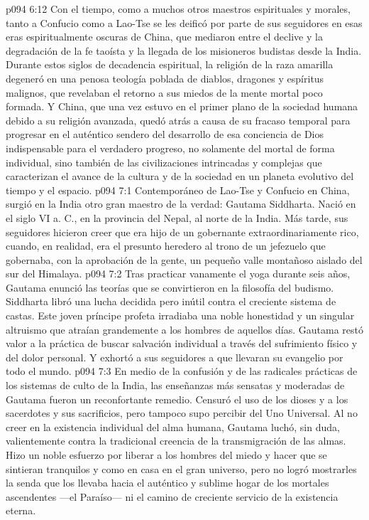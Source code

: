 \vs p094 6:12 Con el tiempo, como a muchos otros maestros espirituales y morales, tanto a Confucio como a Lao\hyp{}Tse se les deificó por parte de sus seguidores en esas eras espiritualmente oscuras de China, que mediaron entre el declive y la degradación de la fe taoísta y la llegada de los misioneros budistas desde la India. Durante estos siglos de decadencia espiritual, la religión de la raza amarilla degeneró en una penosa teología poblada de diablos, dragones y espíritus malignos, que revelaban el retorno a sus miedos de la mente mortal poco formada. Y China, que una vez estuvo en el primer plano de la sociedad humana debido a su religión avanzada, quedó atrás a causa de su fracaso temporal para progresar en el auténtico sendero del desarrollo de esa conciencia de Dios indispensable para el verdadero progreso, no solamente del mortal de forma individual, sino también de las civilizaciones intrincadas y complejas que caracterizan el avance de la cultura y de la sociedad en un planeta evolutivo del tiempo y el espacio.
\vs p094 7:1 Contemporáneo de Lao\hyp{}Tse y Confucio en China, surgió en la India otro gran maestro de la verdad: Gautama Siddharta. Nació en el siglo VI a. C., en la provincia del Nepal, al norte de la India. Más tarde, sus seguidores hicieron creer que era hijo de un gobernante extraordinariamente rico, cuando, en realidad, era el presunto heredero al trono de un jefezuelo que gobernaba, con la aprobación de la gente, un pequeño valle montañoso aislado del sur del Himalaya.
\vs p094 7:2 Tras practicar vanamente el yoga durante seis años, Gautama enunció las teorías que se convirtieron en la filosofía del budismo. Siddharta libró una lucha decidida pero inútil contra el creciente sistema de castas. Este joven príncipe profeta irradiaba una noble honestidad y un singular altruismo que atraían grandemente a los hombres de aquellos días. Gautama restó valor a la práctica de buscar salvación individual a través del sufrimiento físico y del dolor personal. Y exhortó a sus seguidores a que llevaran su evangelio por todo el mundo.
\vs p094 7:3 En medio de la confusión y de las radicales prácticas de los sistemas de culto de la India, las enseñanzas más sensatas y moderadas de Gautama fueron un reconfortante remedio. Censuró el uso de los dioses y a los sacerdotes y sus sacrificios, pero tampoco supo percibir  del Uno Universal. Al no creer en la existencia individual del alma humana, Gautama luchó, sin duda, valientemente contra la tradicional creencia de la transmigración de las almas. Hizo un noble esfuerzo por liberar a los hombres del miedo y hacer que se sintieran tranquilos y como en casa en el gran universo, pero no logró mostrarles la senda que los llevaba hacia el auténtico y sublime hogar de los mortales ascendentes ---el Paraíso--- ni el camino de creciente servicio de la existencia eterna.
